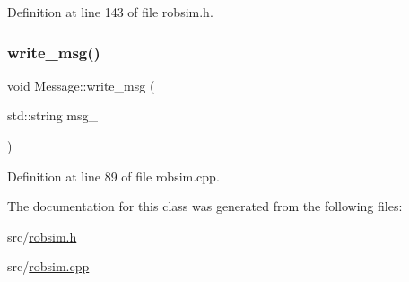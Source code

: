 Definition at line 143 of file robsim.\+h.

\mbox{\label{classMessage_a9da1640bba6e0b0f63752f1927662ada}} 
\subsubsection{\texorpdfstring{write\+\_\+msg()}{write\_msg()}}
{\footnotesize\ttfamily void Message\+::write\+\_\+msg (\begin{DoxyParamCaption}\item[{std\+::string}]{msg\+\_\+ }\end{DoxyParamCaption})}



Definition at line 89 of file robsim.\+cpp.



The documentation for this class was generated from the following files\+:\begin{DoxyCompactItemize}
\item 
src/\hyperlink{robsim_8h}{robsim.\+h}\item 
src/\hyperlink{robsim_8cpp}{robsim.\+cpp}\end{DoxyCompactItemize}
